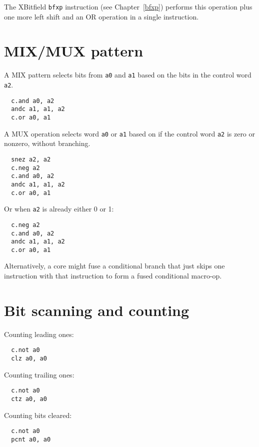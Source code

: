 The XBitfield {\tt bfxp} instruction (see Chapter~\ref{bfxp}) performs this operation
plus one more left shift and an OR operation in a single instruction.

\section{MIX/MUX pattern}
\label{mixmux}

A MIX pattern selects bits from {\tt a0} and {\tt a1} based on the bits in
the control word {\tt a2}.

\begin{verbatim}
  c.and a0, a2
  andc a1, a1, a2
  c.or a0, a1
\end{verbatim}

A MUX operation selects word {\tt a0} or {\tt a1} based on if the control
word {\tt a2} is zero or nonzero, without branching.

\begin{verbatim}
  snez a2, a2
  c.neg a2
  c.and a0, a2
  andc a1, a1, a2
  c.or a0, a1
\end{verbatim}

Or when {\tt a2} is already either 0 or 1:

\begin{verbatim}
  c.neg a2
  c.and a0, a2
  andc a1, a1, a2
  c.or a0, a1
\end{verbatim}

Alternatively, a core might fuse a conditional branch that just skips one
instruction with that instruction to form a fused conditional macro-op.

\section{Bit scanning and counting}

Counting leading ones:

\begin{verbatim}
  c.not a0
  clz a0, a0
\end{verbatim}

Counting trailing ones:

\begin{verbatim}
  c.not a0
  ctz a0, a0
\end{verbatim}

Counting bits cleared:

\begin{verbatim}
  c.not a0
  pcnt a0, a0
\end{verbatim}

